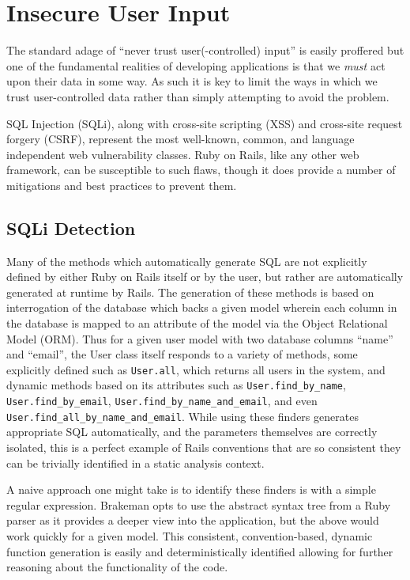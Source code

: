 \documentclass[conference]{IEEEtran}
\begin{document}
\section{Insecure User Input}

The standard adage of ``never trust user(-controlled) input'' is easily
proffered but one of the fundamental realities of developing applications
is that we \emph{must} act upon their data in some way.  As such it is key to
limit the ways in which we trust user-controlled data rather than simply
attempting to avoid the problem.

SQL Injection (SQLi), along with cross-site scripting (XSS) and cross-site request forgery
(CSRF), represent the most well-known, common, and language independent web vulnerability
classes.  Ruby on Rails, like any other web framework, can be susceptible to such
flaws, though it does provide a number of mitigations and best practices to prevent them.

\subsection{SQLi Detection}

Many of the methods which automatically generate SQL are not explicitly defined
by either Ruby on Rails itself or by the user, but rather are automatically generated at
runtime by Rails.  The generation of these methods is based on interrogation of the
database which backs a given model wherein each column in the database is mapped to an
attribute of the model via the Object Relational Model (ORM).  Thus for a given user model
with two database columns ``name'' and ``email'', the User class itself responds to a
variety of methods, some explicitly defined such as \texttt{User.all}, which returns all
users in the system, and dynamic methods based on its attributes such as
\texttt{User.find\_by\_name}, \texttt{User.find\_by\_email},
\texttt{User.find\_by\_name\_and\_email}, and even
\texttt{User.find\_all\_by\_name\_and\_email}.  While using these finders generates
appropriate SQL automatically, and the parameters themselves are correctly isolated, this
is a perfect example of Rails conventions that are so consistent they can be trivially
identified in a static analysis context.

A naive approach one might take is to identify these finders is with a simple regular
expression.  Brakeman opts to use the abstract syntax tree from a Ruby parser as it
provides a deeper view into the application, but the above would work quickly for a given
model.  This consistent, convention-based, dynamic function generation is easily and
deterministically identified allowing for further reasoning about the functionality of the
code.
\end{document}
